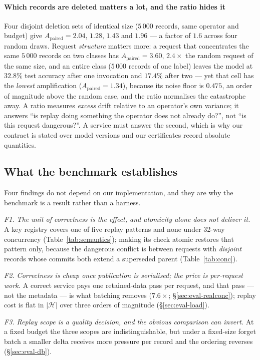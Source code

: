 \documentclass[conference]{IEEEtran}
\newcommand{\Apa}{A_{\mathrm{paired}}}
\newcommand{\Hset}{\mathcal{H}}
\begin{document}
\paragraph{Which records are deleted matters a lot, and the ratio hides it}
Four disjoint deletion sets of identical size ($5\,000$ records, same operator and
budget) give $\Apa=2.04$, $1.28$, $1.43$ and $1.96$ --- a factor of $1.6$ across four
random draws.  Request \emph{structure} matters more: a request that concentrates the
same $5\,000$ records on two classes has $\Apa=3.60$, $2.4\times$ the random request of
the same size, and an entire class ($5\,000$ records of one label) leaves the model at
$32.8\%$ test accuracy after one invocation and $17.4\%$ after two --- yet that cell has
the \emph{lowest} amplification ($\Apa=1.34$), because its noise floor is $0.475$, an
order of magnitude above the random case, and the ratio normalises the catastrophe away.
A ratio measures \emph{excess} drift relative to an operator's own variance; it answers
``is replay doing something the operator does not already do?'', not ``is this request
dangerous?''.  A service must answer the second, which is why our contract is stated
over model versions and our certificates record absolute quantities.

\subsection{What the benchmark establishes}
\label{sec:findings}
Four findings do not depend on our implementation, and they are why the benchmark is a result
rather than a harness.

\emph{F1. The unit of correctness is the effect, and atomicity alone does not deliver it.}  A
key registry covers one of five replay patterns and none under 32-way concurrency
(Table~\ref{tab:semantics}); making its check atomic restores that pattern only, because the
dangerous conflict is between requests with \emph{disjoint} records whose commits both extend
a superseded parent (Table~\ref{tab:conc}).

\emph{F2. Correctness is cheap once publication is serialised; the price is per-request work.}
A correct service pays one retained-data pass per request, and that pass --- not the metadata
--- is what batching removes ($7.6\times$; \S\ref{sec:eval-realconc}); replay cost is flat in
$|\Hset|$ over three orders of magnitude (\S\ref{sec:eval-load}).

\emph{F3. Replay scope is a quality decision, and the obvious comparison can invert.}  At a
fixed budget the three scopes are indistinguishable, but under a fixed-size forget batch a
smaller delta receives more pressure per record and the ordering reverses
(\S\ref{sec:eval-db}).
\end{document}
